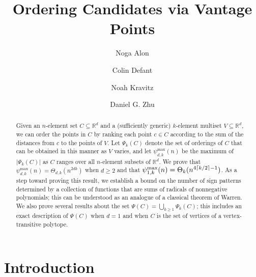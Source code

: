 \documentclass[11pt]{amsart}
\theoremstyle{definition}
\DeclarePairedDelimiter{\ceil}{\lceil}{\rceil}
\newcommand{\perm}{\psi^{\mathrm{max}}}
\newcommand{\RR}{\mathbb{R}}
\begin{document}
\title{Ordering Candidates via Vantage Points} 

\author{Noga Alon}
\address{Department of Mathematics, Princeton University, Princeton, NJ 08544, USA and Schools of Mathematical Sciences and Computer Science, Tel Aviv University, Tel Aviv, Israel}
\author{Colin Defant}
\address{Department of Mathematics, Harvard University, Cambridge, MA 02139, USA}
\author{Noah Kravitz}
\address{Department of Mathematics, Princeton University, Princeton, NJ 08540, USA}
\author{Daniel G. Zhu}
\address{Department of Mathematics, Massachusetts Institute of Technology, Cambridge, MA 02139, USA}

\begin{abstract}
Given an $n$-element set $C\subseteq\RR^d$ and a (sufficiently generic) $k$-element multiset $V\subseteq\RR^d$, we can order the points in $C$ by ranking each point $c\in C$ according to the sum of the distances from $c$ to the points of $V$. Let $\Psi_k(C)$ denote the set of orderings of $C$ that can be obtained in this manner as $V$ varies, and let $\perm_{d,k}(n)$ be the maximum of $\lvert\Psi_k(C)\rvert$ as $C$ ranges over all $n$-element subsets of $\RR^d$. We prove that $\perm_{d,k}(n)=\Theta_{d,k}(n^{2dk})$ when $d \geq 2$ and that $\perm_{1,k}(n)=\Theta_k(n^{4\ceil{k/2}-1})$. As a step toward proving this result, we establish a bound on the number of sign patterns determined by a collection of functions that are sums of radicals of nonnegative polynomials; this can be understood as an analogue of a classical theorem of Warren. We also prove several results about the set $\Psi(C)=\bigcup_{k\geq 1}\Psi_k(C)$; this includes an exact description of $\Psi(C)$ when $d=1$ and when $C$ is the set of vertices of a vertex-transitive polytope. 
\end{abstract}

\maketitle

\section{Introduction}\label{sec:intro}
\end{document}
